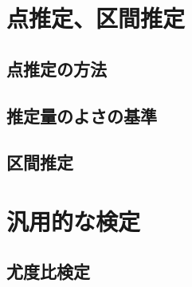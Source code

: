 \section{点推定、区間推定}
\label{sec:stat-estimation}


\subsection{点推定の方法}

\subsection{推定量のよさの基準}

\subsection{区間推定}

\section{汎用的な検定}
\label{sec:stat-general-tests}


\subsection{尤度比検定}

